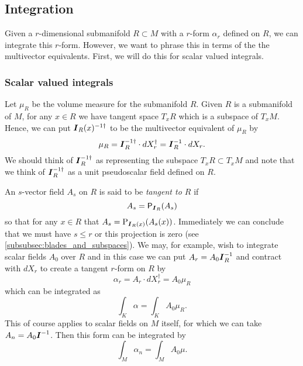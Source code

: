 \subsection{Integration}
\label{subsec:integration_on_submanifolds}

Given a $r$-dimensional submanifold $R \subset M$ with a $r$-form $\alpha_r$ defined on $R$, we can integrate this $r$-form. However, we want to phrase this in terms of the the multivector equivalents.  First, we will do this for scalar valued integrals. 

\subsubsection{Scalar valued integrals}
Let $\mu_R$ be the volume measure for the submanifold $R$.  Given $R$ is a submanifold of $M$, for any $x \in R$ we have tangent space $T_x R$ which is a subspace of $T_x M$. Hence, we can put $\boldsymbol{I}_R(x)^{-1 \dagger}$ to be the multivector equivalent of $\mu_R$ by
\begin{equation}
\label{eq:submanifold_volume_form}
\mu_R = \boldsymbol{I}_R^{-1 \dagger} \cdot dX_r^\dagger = \boldsymbol{I}_R^{-1} \cdot dX_r.
\end{equation}
We should think of $\boldsymbol{I}_R^{-1 \dagger}$ as representing the subspace $T_x R \subset T_x M$ and note that we think of $\boldsymbol{I}_R^{-1 \dagger}$ as a unit pseudoscalar field defined on $R$. 

An $s$-vector field $A_s$ on $R$ is said to be \emph{tangent to $R$} if
\begin{equation}
A_s = \mathsf{P}_{\boldsymbol{I}_R}(A_s)
\end{equation} 
so that for any $x \in R$ that $A_s = \operatorname{P}_{\boldsymbol{I}_R(x)}(A_s(x))$. Immediately we can conclude that we must have $s\leq r$ or this projection is zero (see \cref{subsubsec:blades_and_subspaces}). We may, for example, wish to integrate scalar fields $A_0$ over $R$ and in this case we can put $A_r = A_0 \boldsymbol{I}_R^{-1}$ and contract with $dX_r$ to create a tangent $r$-form on $R$ by 
\begin{equation}
\alpha_r = A_r \cdot dX_r^\dagger = A_0 \mu_R
\end{equation}
which can be integrated as
\begin{equation}
\int_K \alpha = \int_K A_0 \mu_R.
\end{equation}
This of course applies to scalar fields on $M$ itself, for which we can take $A_n = A_0 \boldsymbol{I}^{-1}$. Then this form can be integrated by
\begin{equation}
\int_M \alpha_n = \int_M A_0 \mu.
\end{equation}

